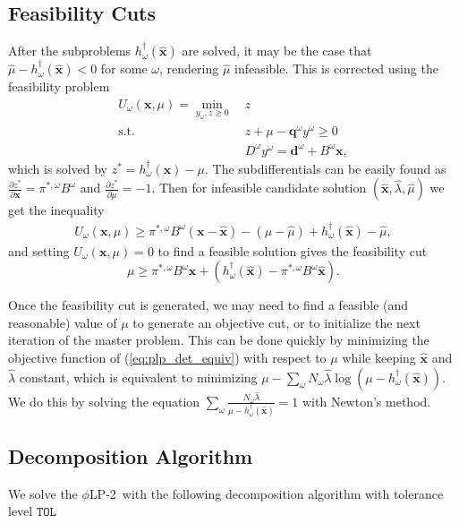 \documentclass[11pt]{article}
\newcommand{\x}{\mathbf{x}}
\newcommand{\xh}{\hat{\x}}
\newcommand{\lh}{\hat{\lambda}}
\newcommand{\mh}{\hat{\mu}}
\newcommand{\q}{\mathbf{q}}
\renewcommand{\d}{\mathbf{d}}
\newcommand{\st}{\mbox{s.t.}}
\newcommand{\plp}{$\phi$LP-2}
\begin{document}
\subsection{Feasibility Cuts}
After the subproblems $h^\dagger_\omega(\xh)$ are solved, it may be the case that $\mh - h^\dagger_\omega(\xh) < 0$ for some $\omega$, rendering $\mh$ infeasible.
This is corrected using the feasibility problem
\begin{align*}
	U_\omega(\x,\mu) = \min_{y_\omega,z \geq 0} \ & z \\
	\st \ & z + \mu - \q^\omega y^\omega \geq 0 \\
	& D^\omega y^\omega = \d^\omega + B^\omega \x,
\end{align*}
which is solved by $z^* = h^\dagger_\omega(\x) - \mu$.
The subdifferentials can be easily found as $\frac{\partial z^*}{\partial \x} = \pi^{*,\omega} B^\omega$ and $\frac{\partial z^*}{\partial \mu} = -1$.
Then for infeasible candidate solution $(\xh,\lh,\mh)$ we get the inequality
\begin{align*}
	U_\omega(\x,\mu) \geq \pi^{*,\omega}B^\omega(\x-\xh) - (\mu -\mh) + h^\dagger_\omega(\xh) - \mh,
\end{align*}
and setting $U_\omega(\x,\mu) = 0$ to find a feasible solution gives the feasibility cut
\[
	\mu \geq \pi^{*,\omega}B^\omega \x + (h^\dagger_\omega(\xh) - \pi^{*,\omega}B^\omega\xh).
\]

Once the feasibility cut is generated, we may need to find a feasible (and reasonable) value of $\mu$ to generate an objective cut, or to initialize the next iteration of the master problem.
This can be done quickly by minimizing the objective function of (\ref{eq:plp_det_equiv}) with respect to $\mu$ while keeping $\xh$ and $\lh$ constant, which is equivalent to minimizing $\mu - \sum_\omega N_\omega \lh \log(\mu - h^\dagger_\omega(\xh))$.
We do this by solving the equation $\sum_\omega \frac{N_\omega \lh}{\mu - h^\dagger_\omega(\xh)} = 1$ with Newton's method.

\subsection{Decomposition Algorithm}

We solve the \plp\ with the following decomposition algorithm with tolerance level $\texttt{TOL}$
\end{document}
